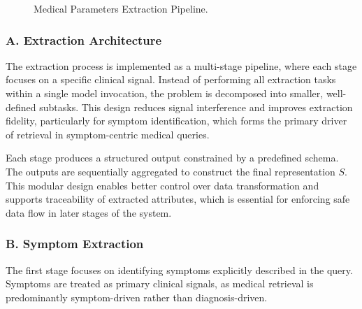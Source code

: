 \documentclass[conference, anonymous]{IEEEtran}
\begin{document}
\begin{figure}[h]
\centering
{}
\caption{Medical Parameters Extraction Pipeline.}
\label{fig:medical_extraction}
\end{figure}


\subsubsection{A. Extraction Architecture}

The extraction process is implemented as a multi-stage pipeline, where each stage focuses on a specific clinical signal. Instead of performing all extraction tasks within a single model invocation, the problem is decomposed into smaller, well-defined subtasks. This design reduces signal interference and improves extraction fidelity, particularly for symptom identification, which forms the primary driver of retrieval in symptom-centric medical queries.

Each stage produces a structured output constrained by a predefined schema. The outputs are sequentially aggregated to construct the final representation $S$. This modular design enables better control over data transformation and supports traceability of extracted attributes, which is essential for enforcing safe data flow in later stages of the system.

\subsubsection{B. Symptom Extraction}

The first stage focuses on identifying symptoms explicitly described in the query. Symptoms are treated as primary clinical signals, as medical retrieval is predominantly symptom-driven rather than diagnosis-driven.
\end{document}
